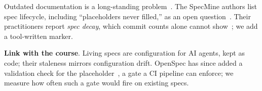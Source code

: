 \documentclass[10pt, conference]{IEEEtran}
\renewcommand{\paragraph}[1]{\noindent\textbf{#1}.}
\begin{document}
Outdated documentation is a long-standing problem~\cite{lethbridge2003,aghajani2019,tan2024}.
The SpecMine authors list spec lifecycle, including ``placeholders never filled,'' as an
open question~\cite{specmine_paper}. Their practitioners report \emph{spec decay}, which
commit counts alone cannot show~\cite{specmine_paper}; we add a tool-written marker.

\paragraph{Link with the course} Living specs are configuration for AI agents, kept as
code; their staleness mirrors configuration drift. OpenSpec has since added a validation
check for the placeholder~\cite{openspec_pr1671}, a gate a CI pipeline can enforce; we
measure how often such a gate would fire on existing specs.
\end{document}

